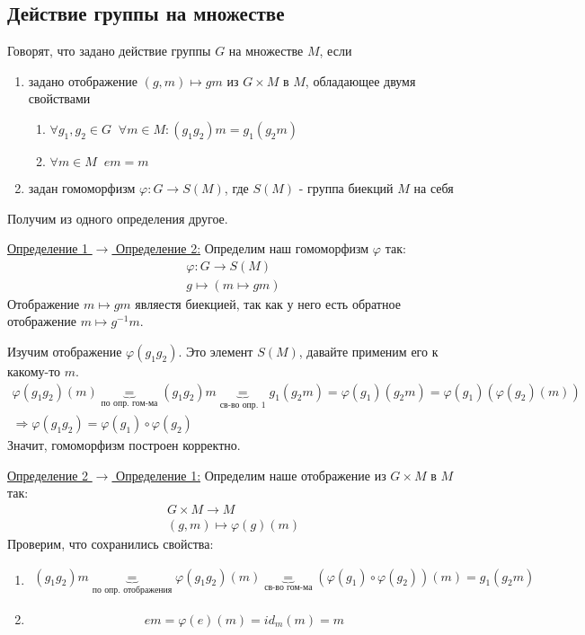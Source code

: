 \subsection{Действие группы на множестве}
\begin{conj}
    Говорят, что задано действие группы $G$ на множестве $M$, если
    \begin{enumerate}
        \item задано отображение $(g, m) \mapsto gm$ из  $G \times M$ в $M$, обладающее двумя свойствами
        \begin{enumerate}
            \item $\forall g_1, g_2 \in G \;\; \forall m \in M : (g_1g_2)m = g_1(g_2m)$
            \item $\forall m \in M \;\; em = m$
        \end{enumerate}
        \item задан гомоморфизм $\varphi: G \to S(M)$, где $S(M)$ - группа биекций $M$ на себя
    \end{enumerate}
\end{conj}
Получим из одного определения другое.

\underline{Определение 1 $\to$ Определение 2:} Определим наш гомоморфизм $\varphi$ так:
\begin{gather*}
    \varphi: G \to S(M) \\
    g \mapsto (m \mapsto gm)
\end{gather*} 
Отображение $m \mapsto gm$ являестя биекцией, так как у него есть обратное отображение $m \mapsto g^{-1}m$.

Изучим отображение $\varphi(g_1g_2)$. Это элемент $S(M)$, давайте применим его к какому-то $m$.
\begin{gather*}
    \varphi(g_1g_2)(m) \underbrace{=}_{\text{по опр. гом-ма}} (g_1g_2)m \underbrace{=}_{\text{св-во опр. 1}} g_1(g_2m) = \varphi(g_1)(g_2m) = \varphi(g_1)(\varphi(g_2)(m)) \\
    \Rightarrow \varphi(g_1g_2) = \varphi(g_1) \circ \varphi(g_2)
\end{gather*}
Значит, гомоморфизм построен корректно.

\underline{Определение 2 $\to$ Определение 1:} Определим наше отображение из $G \times M$ в $M$ так:
\begin{gather*}
    G \times M \to M \\
    (g, m) \mapsto \varphi(g)(m)
\end{gather*}
Проверим, что сохранились свойства:
\begin{enumerate}
    \item \begin{gather*}
        (g_1g_2)m \underbrace{=}_{\text{по опр. отображения}} \varphi(g_1g_2)(m) \underbrace{=}_{\text{св-во гом-ма}} (\varphi(g_1) \circ \varphi(g_2))(m) = g_1(g_2m)
    \end{gather*}
    \item \[ em = \varphi(e)(m) = id_m(m) = m \]
\end{enumerate}

